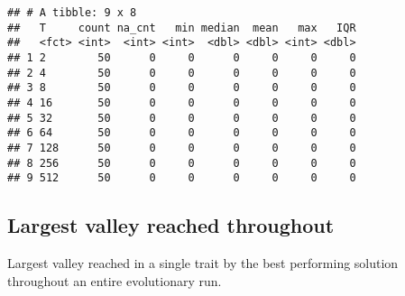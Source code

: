 \documentclass[]{book}
\begin{document}
\begin{verbatim}
## # A tibble: 9 x 8
##   T     count na_cnt   min median  mean   max   IQR
##   <fct> <int>  <int> <int>  <dbl> <dbl> <int> <dbl>
## 1 2        50      0     0      0     0     0     0
## 2 4        50      0     0      0     0     0     0
## 3 8        50      0     0      0     0     0     0
## 4 16       50      0     0      0     0     0     0
## 5 32       50      0     0      0     0     0     0
## 6 64       50      0     0      0     0     0     0
## 7 128      50      0     0      0     0     0     0
## 8 256      50      0     0      0     0     0     0
## 9 512      50      0     0      0     0     0     0
\end{verbatim}

\hypertarget{largest-valley-reached-throughout-6}{%
\subsection{Largest valley reached throughout}\label{largest-valley-reached-throughout-6}}

Largest valley reached in a single trait by the best performing solution throughout an entire evolutionary run.
\end{document}
